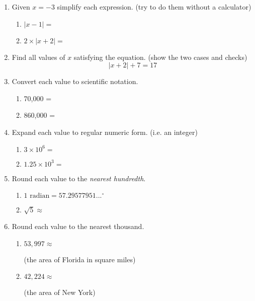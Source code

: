 \begin{enumerate}
\item Given $x=-3$ simplify each expression. (try to do them without a calculator)
  \begin{multicols}{2}
    \begin{enumerate}[itemsep=1.25cm]
      \item $|x-1|=$
      \item $2 \times|x+2|=$
    \end{enumerate}
  \end{multicols} \vspace{1cm}

\item Find all values of $x$ satisfying the equation. (show the two cases and checks) 
  $$ |x+2|+7 = 17$$

\newpage
\item Convert each value to scientific notation.
  \begin{multicols}{2}
    \begin{enumerate}[itemsep=1cm]
      \item 70,000 =
      \item 860,000 =
    \end{enumerate}
  \end{multicols} \vspace{1cm}

\item Expand each value to regular numeric form. (i.e. an integer)
  \begin{multicols}{2}
    \begin{enumerate}[itemsep=1cm]
      \item $3 \times 10^{6}=$
      \item $1.25 \times 10^{3}=$
    \end{enumerate}
  \end{multicols} \vspace{0.7cm}

\item Round each value to the \emph{nearest hundredth}.
  \begin{multicols}{2}
    \begin{enumerate}
      \item $1 \text{ radian}=57.29577951...^\circ$ \par 
      \item $\sqrt{5} \approx$
    \end{enumerate}
  \end{multicols} \smallskip 

\item Round each value to the nearest thousand.
  \begin{multicols}{2}
    \begin{enumerate}
      \item $53,997 \approx$ \par \bigskip (the area of Florida in square miles)
      \item $42,224 \approx$ \par \bigskip (the area of New York)
    \end{enumerate}
  \end{multicols}


\end{enumerate}
